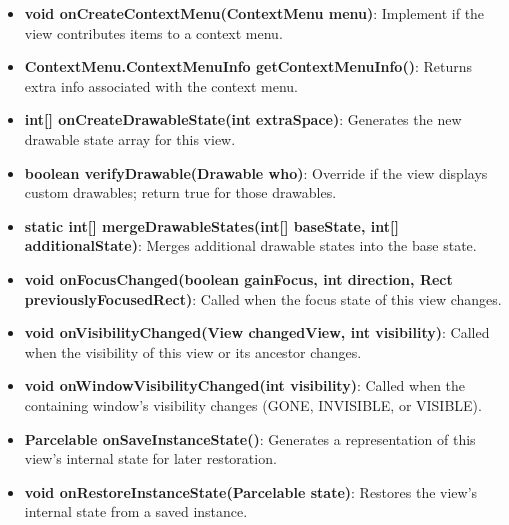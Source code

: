 \documentclass{report}
\begin{document}
\begin{itemize}
\begin{itemize}
                \item \textbf{void onCreateContextMenu(ContextMenu menu)}:  
                    Implement if the view contributes items to a context menu.

                \item \textbf{ContextMenu.ContextMenuInfo getContextMenuInfo()}:  
                    Returns extra info associated with the context menu.

                \item \textbf{int[] onCreateDrawableState(int extraSpace)}:  
                    Generates the new drawable state array for this view.

                \item \textbf{boolean verifyDrawable(Drawable who)}:  
                    Override if the view displays custom drawables; return true for those drawables.

                \item \textbf{static int[] mergeDrawableStates(int[] baseState, int[] additionalState)}:  
                    Merges additional drawable states into the base state.

                \item \textbf{void onFocusChanged(boolean gainFocus, int direction, Rect previouslyFocusedRect)}:  
                    Called when the focus state of this view changes.

                \item \textbf{void onVisibilityChanged(View changedView, int visibility)}:  
                    Called when the visibility of this view or its ancestor changes.

                \item \textbf{void onWindowVisibilityChanged(int visibility)}:  
                    Called when the containing window’s visibility changes (GONE, INVISIBLE, or VISIBLE).

                \item \textbf{Parcelable onSaveInstanceState()}:  
                    Generates a representation of this view’s internal state for later restoration.

                \item \textbf{void onRestoreInstanceState(Parcelable state)}:  
                    Restores the view’s internal state from a saved instance.


\end{itemize}
\end{itemize}
\end{document}
